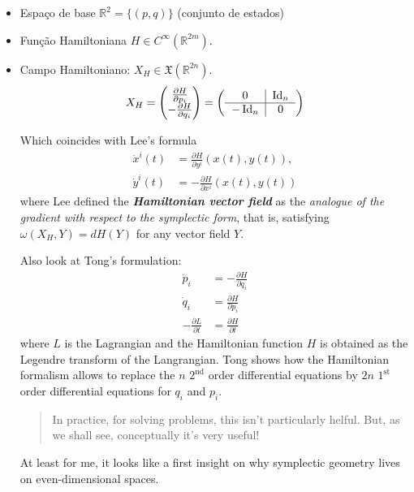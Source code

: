 \begin{itemize}
	\item Espa\c co de base $\mathbb{R}^{2}=\{(p,q)\} $ (conjunto de estados)
	\item Fun\c c\~ao Hamiltoniana $H\in C^{\infty}(\mathbb{R}^{2m} )$.
	\item Campo Hamiltoniano: $X_{H}\in \mathfrak{X}(\mathbb{R}^{2n})$.
		\begin{align*}
			X_{H}=\begin{pmatrix}  \frac{\partial H}{\partial p_{i}}\\-\frac{\partial H}{\partial q_{i}} \end{pmatrix} = \left(\begin{tabular}{c|c}0&$\operatorname{Id}_{n}$\\ \hline
		$-\operatorname{Id}_{n}$&0
\end{tabular}\right)
\end{align*}

	Which coincides with Lee's formula
\begin{align*}
	\dot x^{i}(t)&=\frac{\partial H}{\partial y^{i}}(x(t),y(t)),\\
	\dot y^{i}(t)&=-\frac{\partial H}{\partial x^{i}}(x(t),y(t))
\end{align*}
where Lee defined the \textit{\textbf{Hamiltonian vector field}} as the  \textit{analogue of the gradient with respect to the symplectic form}, that is, satisfying $\omega(X_{H},Y)=dH(Y)$ for any vector field $Y$.

Also look at Tong's formulation:
\begin{align*}
	\dot p_{i}&=-\frac{\partial H}{\partial q_{i}}\\
	\dot q_{i}&=\frac{\partial H}{\partial p_{i}}\\
	-\frac{\partial L}{\partial t}&=\frac{\partial H}{\partial t}
\end{align*}
where $L$ is the Lagrangian and the Hamiltonian function $H$ is obtained as the Legendre transform of the Langrangian. Tong shows how the Hamiltonian formalism allows to replace the $n$ $2^{\operatorname{nd}}$ order differential equations by $2n$ $1^{\operatorname{st}}$ order differential equations for $q_{i}$ and $p_{i}$.

\begin{quotation}
	In practice, for solving problems, this isn't particularly helful. But, as we shall see, conceptually it's very useful!
\end{quotation}
At least for me, it looks like a first insight on why symplectic geometry lives on even-dimensional spaces.
\end{itemize}

